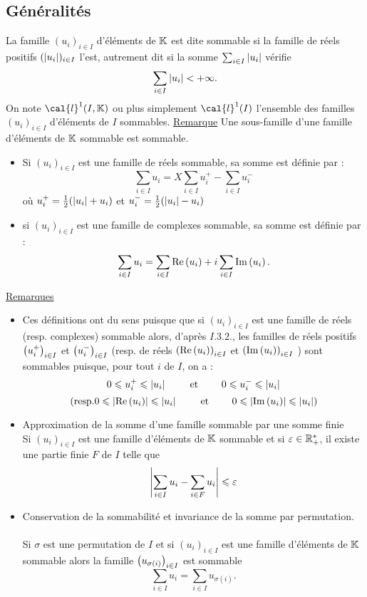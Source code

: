 \subsection{Généralités}
\begin{defprop}[Sommabilité]
    
    La famille \((u_i)_{i\in I}\) d’éléments de \(\mathbb{K}\)   est dite sommable si la famille de réels positifs \((\left\lvert u_i\right\rvert)_{i\in I}\) l’est, autrement dit si la somme \(\sum_{i\in I}\left\lvert u_i\right\rvert\) vérifie
    \[\sum_{i\in I}\left\lvert u_i\right\rvert < +\infty .\]
    On note \(\cal{l}^1(I, \K  )\) ou plus simplement \(\cal{l}^1(I)\) l’ensemble des familles \((u_i)_{i\in I}\) d’éléments de \(I\) sommables.
    \underline{Remarque}
    Une sous-famille d’une famille d’éléments de \(\mathbb{K}\) sommable est sommable.
\end{defprop}
\begin{defprop}
    \begin{itemize}
        \item Si \((u_i)_{i\in I}\) est une famille de réels sommable, sa somme est définie par :
            \[\sum_{i\in I}u_i = X\sum_{i\in I}u^{+}_i - \sum_{i\in I}u^{-}_i\]
        où \(u^{+}_i = \frac{1}{2} (\left\lvert u_i\right\rvert + u_i)\) et \(u^{-}_i = \frac{1}{2} (\left\lvert u_i\right\rvert - u_i)\)
        \item si \((u_i)_{i\in I}\) est une famille de complexes sommable, sa somme est définie par :
            \[\sum_{i\in I}u_i = \sum_{i\in I}\operatorname{Re}\left(u_i\right) + i\sum_{i\in I}\operatorname{Im}\left(u_i\right).\]
    \end{itemize}
    \underline{Remarques}
    \begin{itemize}
        \item Ces définitions ont du sens puisque que si \((u_i)_{i\in I}\) est une famille de réels (resp. complexes) sommable alors, d’après \(I. 3. 2.\), les familles de réels positifs \(\left(u^{+}_i\right)_{i\in I}\) et \(\left(u^{-}_i\right)_{i\in I}\) (resp. de réels \(\left(\operatorname{Re}\left(u_i\right)\right)_{i\in I}\) et \(\left(\operatorname{Im}\left(u_i\right)\right)_{i\in I}\) ) sont sommables puisque, pour tout \(i\) de \(I\), on a :
        \[0 \leqslant  u^{+}_i \leqslant  \left\lvert u_i\right\rvert\qquad \text{ et } \qquad 0 \leqslant  u^{-}_i \leqslant  \left\lvert u_i\right\rvert\]
        \[(\text{resp.} 0 \leqslant  \left\lvert\operatorname{Re}\left(u_i\right)\right\rvert \leqslant  \left\lvert u_i\right\rvert \qquad \text{ et } \qquad 0 \leqslant  \left\lvert\operatorname{Im}\left(u_i\right)\right\rvert \leqslant  \left\lvert u_i\right\rvert)\]
        \item Approximation de la somme d’une famille sommable par une somme finie\\
        Si \((u_i)_{i\in I}\) est une famille d’éléments de \(\mathbb{K}\)   sommable et si \(\varepsilon \in  \mathbb{R}_+^*\), il existe une partie finie \(F\) de \(I\) telle que
        \[\left\lvert\sum_{i\in I}u_i - \sum_{i\in F}u_i\right\rvert \leqslant \varepsilon\]
        \item Conservation de la sommabilité et invariance de la somme par permutation.\\~\\
        Si \(\sigma\) est une permutation de \(I\) et si \((u_i)_{i\in I}\) est une famille d’éléments de \(\mathbb{K} \)  sommable alors la famille \(\left(u_{\sigma(i)}\right)_{i\in I}\) est sommable \[\sum_{i\in I}u_i = \sum_{i\in I}u_{\sigma(i)}.\]
    \end{itemize}
\end{defprop}
